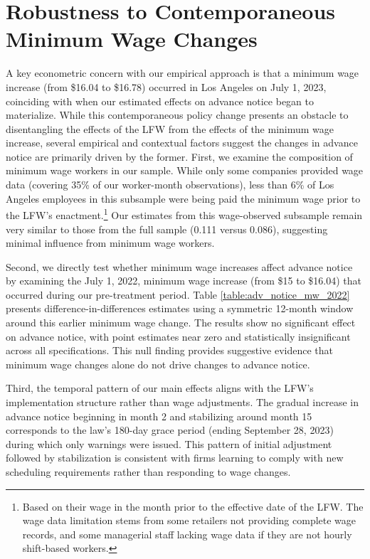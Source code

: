 \documentclass[letterpaper,11pt,leqno]{article}
\theoremstyle{paper}
\begin{document}
\newpage

\section{Robustness to Contemporaneous Minimum Wage Changes} \label{sec:min_wage_changes}

A key econometric concern with our empirical approach is that a minimum wage increase (from \$16.04 to \$16.78) occurred in Los Angeles on July 1, 2023, coinciding with when our estimated effects on advance notice began to materialize. While this contemporaneous policy change presents an obstacle to disentangling the effects of the LFW from the effects of the minimum wage increase, several empirical and contextual factors suggest the changes in advance notice are primarily driven by the former. 
First, we examine the composition of minimum wage workers in our sample. While only some companies provided wage data (covering 35\% of our worker-month observations), less than 6\% of Los Angeles employees in this subsample were being paid the minimum wage prior to the LFW's enactment.\footnote{Based on their wage in the month prior to the effective date of the LFW. The wage data limitation stems from some retailers not providing complete wage records, and some managerial staff lacking wage data if they are not hourly shift-based workers.} Our estimates from this wage-observed subsample remain very similar to those from the full sample (0.111 versus 0.086), suggesting minimal influence from minimum wage workers.

Second, we directly test whether minimum wage increases affect advance notice by examining the July 1, 2022, minimum wage increase (from \$15 to \$16.04) that occurred during our pre-treatment period. Table \ref{table:adv_notice_mw_2022} presents difference-in-differences estimates using a symmetric 12-month window around this earlier minimum wage change. The results show no significant effect on advance notice, with point estimates near zero and statistically insignificant across all specifications. This null finding provides suggestive evidence that minimum wage changes alone do not drive changes to advance notice.

Third, the temporal pattern of our main effects aligns with the LFW's implementation structure rather than wage adjustments. The gradual increase in advance notice beginning in month 2 and stabilizing around month 15 corresponds to the law's 180-day grace period (ending September 28, 2023) during which only warnings were issued. This pattern of initial adjustment followed by stabilization is consistent with firms learning to comply with new scheduling requirements rather than responding to wage changes.
\end{document}
